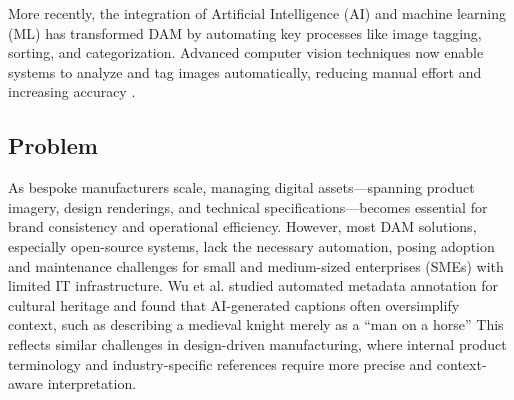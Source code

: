 \documentclass[a4paper,10pt,twocolumn]{article}
\numberwithin{figure}{section}
\numberwithin{table}{section}
\begin{document}
More recently, the integration of Artificial Intelligence (AI) and machine learning (ML) has transformed 
DAM by automating key processes like image tagging, sorting, and categorization. Advanced computer 
vision techniques now enable systems to analyze and tag images automatically, 
reducing manual effort and increasing accuracy \citep{MINGfANG}.



\subsection{Problem}
As bespoke manufacturers scale, managing digital assets—spanning product imagery, design renderings,
and technical specifications—becomes essential for brand consistency and operational efficiency.
However, most DAM solutions, especially open-source systems, lack the necessary automation, 
posing adoption and maintenance challenges for small and medium-sized enterprises (SMEs) with limited IT infrastructure. 
Wu et al. studied automated metadata annotation for cultural heritage and found that AI-generated 
captions often oversimplify context, such as describing a medieval knight merely as a “man on a horse” \citep{MINGfANG} 
This reflects similar challenges in design-driven manufacturing, where internal product terminology and industry-specific 
references require more precise and context-aware interpretation.
\end{document}
